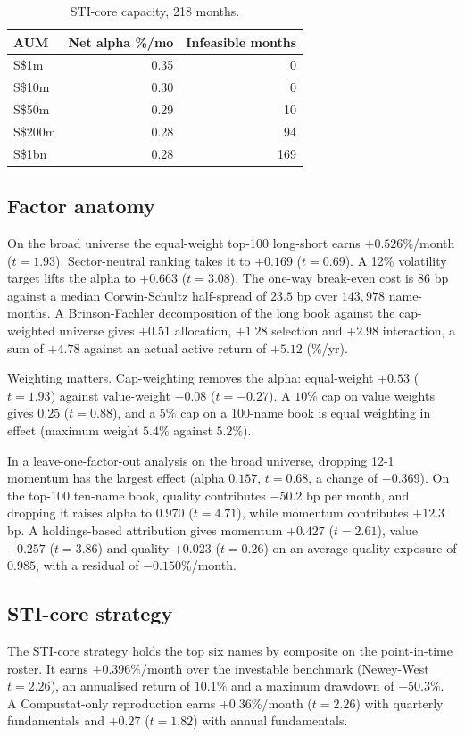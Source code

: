\documentclass[11pt,a4paper]{article}
\begin{document}
\begin{table}[h]
\centering
\caption{STI-core capacity, 218 months.}
\label{tab:cap}
\begin{tabular}{lrr}
\toprule
AUM & Net alpha \%/mo & Infeasible months \\
\midrule
S\$1m & 0.35 & 0 \\
S\$10m & 0.30 & 0 \\
S\$50m & 0.29 & 10 \\
S\$200m & 0.28 & 94 \\
S\$1bn & 0.28 & 169 \\
\bottomrule
\end{tabular}
\end{table}

\subsection{Factor anatomy}
On the broad universe the equal-weight top-100 long-short earns $+0.526$\%/month ($t=1.93$). Sector-neutral ranking takes it to $+0.169$ ($t=0.69$). A 12\% volatility target lifts the alpha to $+0.663$ ($t=3.08$). The one-way break-even cost is $86$ bp against a median Corwin-Schultz half-spread of $23.5$ bp over $143{,}978$ name-months. A Brinson-Fachler decomposition of the long book against the cap-weighted universe gives $+0.51$ allocation, $+1.28$ selection and $+2.98$ interaction, a sum of $+4.78$ against an actual active return of $+5.12$ (\%/yr).

Weighting matters. Cap-weighting removes the alpha: equal-weight $+0.53$ ($t=1.93$) against value-weight $-0.08$ ($t=-0.27$). A $10$\% cap on value weights gives $0.25$ ($t=0.88$), and a $5$\% cap on a 100-name book is equal weighting in effect (maximum weight $5.4$\% against $5.2$\%).

In a leave-one-factor-out analysis on the broad universe, dropping 12-1 momentum has the largest effect (alpha $0.157$, $t=0.68$, a change of $-0.369$). On the top-100 ten-name book, quality contributes $-50.2$ bp per month, and dropping it raises alpha to $0.970$ ($t=4.71$), while momentum contributes $+12.3$ bp. A holdings-based attribution gives momentum $+0.427$ ($t=2.61$), value $+0.257$ ($t=3.86$) and quality $+0.023$ ($t=0.26$) on an average quality exposure of $0.985$, with a residual of $-0.150$\%/month.

\subsection{STI-core strategy}
The STI-core strategy holds the top six names by composite on the point-in-time roster. It earns $+0.396$\%/month over the investable benchmark (Newey-West $t=2.26$), an annualised return of $10.1$\% and a maximum drawdown of $-50.3$\%. A Compustat-only reproduction earns $+0.36$\%/month ($t=2.26$) with quarterly fundamentals and $+0.27$ ($t=1.82$) with annual fundamentals.
\end{document}
